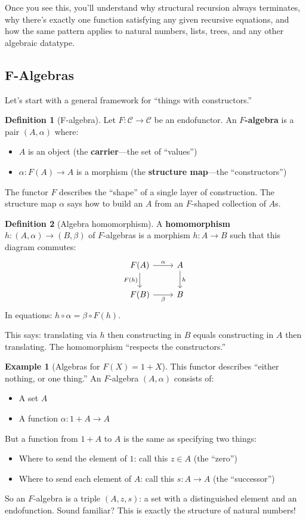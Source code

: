 \documentclass[11pt]{article}
\theoremstyle{definition}
\newtheorem{definition}{Definition}[section]
\newtheorem{example}{Example}[section]
\theoremstyle{plain}
\theoremstyle{remark}
\begin{document}
Once you see this, you'll understand why structural recursion always terminates, why there's exactly one function satisfying any given recursive equations, and how the same pattern applies to natural numbers, lists, trees, and any other algebraic datatype.

\subsection{F-Algebras}

Let's start with a general framework for ``things with constructors.''

\begin{definition}[F-algebra]
Let $F: \mathcal{C} \to \mathcal{C}$ be an endofunctor. An \textbf{$F$-algebra} is a pair $(A, \alpha)$ where:
\begin{itemize}
  \item $A$ is an object (the \textbf{carrier}---the set of ``values'')
  \item $\alpha: F(A) \to A$ is a morphism (the \textbf{structure map}---the ``constructors'')
\end{itemize}
\end{definition}

The functor $F$ describes the ``shape'' of a single layer of construction. The structure map $\alpha$ says how to build an $A$ from an $F$-shaped collection of $A$s.

\begin{definition}[Algebra homomorphism]
A \textbf{homomorphism} $h: (A, \alpha) \to (B, \beta)$ of $F$-algebras is a morphism $h: A \to B$ such that this diagram commutes:
\[
\begin{tikzcd}
F(A) \arrow[r, "\alpha"] \arrow[d, "F(h)"'] & A \arrow[d, "h"] \\
F(B) \arrow[r, "\beta"'] & B
\end{tikzcd}
\]
In equations: $h \circ \alpha = \beta \circ F(h)$.
\end{definition}

This says: translating via $h$ then constructing in $B$ equals constructing in $A$ then translating. The homomorphism ``respects the constructors.''

\begin{example}[Algebras for $F(X) = 1 + X$]
This functor describes ``either nothing, or one thing.'' An $F$-algebra $(A, \alpha)$ consists of:
\begin{itemize}
  \item A set $A$
  \item A function $\alpha: 1 + A \to A$
\end{itemize}
But a function from $1 + A$ to $A$ is the same as specifying two things:
\begin{itemize}
  \item Where to send the element of $1$: call this $z \in A$ (the ``zero'')
  \item Where to send each element of $A$: call this $s: A \to A$ (the ``successor'')
\end{itemize}
So an $F$-algebra is a triple $(A, z, s)$: a set with a distinguished element and an endofunction. Sound familiar? This is exactly the structure of natural numbers!
\end{example}
\end{document}
